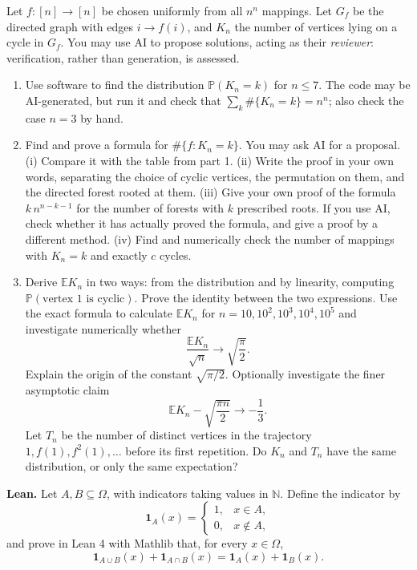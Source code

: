 \documentclass[11pt,a4paper]{article}
\newenvironment{enumeratea}{\begin{enumerate}[label=(\alph*),itemsep=0.28em,topsep=0.25em]}{\end{enumerate}}
\newcommand{\Pbb}{\mathbb P}
\newcommand{\Ebb}{\mathbb E}
\newcommand{\ind}{\mathbf 1}
\begin{document}
\begin{researchtask}
Let $f:[n]\to[n]$ be chosen uniformly from all $n^n$ mappings. Let $G_f$ be the
directed graph with edges $i\to f(i)$, and $K_n$ the number of vertices lying on
a cycle in $G_f$. You may use AI to propose solutions, acting as their \emph{reviewer}:
verification, rather than generation, is assessed.
\begin{enumeratea}
  \item Use software to find the distribution $\Pbb(K_n=k)$ for $n\le 7$.
  The code may be AI-generated, but run it and check that
  $\sum_k\#\{K_n=k\}=n^n$; also check the case $n=3$ by hand.
  \item Find and prove a formula for $\#\{f:K_n=k\}$. You may ask AI for a proposal.
  (i) Compare it with the table from part 1. (ii) Write the proof in your own words,
  separating the choice of cyclic vertices, the permutation on them, and the directed
  forest rooted at them. (iii) Give your own proof of the formula $k\,n^{n-k-1}$
  for the number of forests with $k$ prescribed roots. If you use AI, check whether
  it has actually proved the formula, and give a proof by a different method.
  (iv) Find and numerically check the number of mappings with $K_n=k$ and exactly $c$ cycles.
  \item Derive $\Ebb K_n$ in two ways: from the distribution and by linearity,
  computing $\Pbb(\text{vertex }1\text{ is cyclic})$. Prove the identity between
  the two expressions. Use the exact formula to calculate $\Ebb K_n$ for
  $n=10,10^2,10^3,10^4,10^5$ and investigate numerically whether
  \[ \frac{\Ebb K_n}{\sqrt n}\longrightarrow\sqrt{\frac{\pi}{2}}. \]
  Explain the origin of the constant $\sqrt{\pi/2}$. Optionally investigate the finer asymptotic claim
  \[ \Ebb K_n-\sqrt{\frac{\pi n}{2}}\longrightarrow-\frac13. \]
  Let $T_n$ be the number of distinct vertices in the trajectory $1,f(1),f^2(1),\dots$
  before its first repetition. Do $K_n$ and $T_n$ have the same distribution,
  or only the same expectation?
\end{enumeratea}
\end{researchtask}
\noindent\textbf{Lean.} Let $A,B\subseteq\Omega$, with indicators taking values in $\mathbb N$.
Define the indicator by
\[
\ind_A(x)=\begin{cases}1,&x\in A,\\0,&x\notin A,\end{cases}
\]
and prove in Lean 4 with Mathlib that, for every $x\in\Omega$,
\[ \ind_{A\cup B}(x)+\ind_{A\cap B}(x)=\ind_A(x)+\ind_B(x). \]
\end{document}
